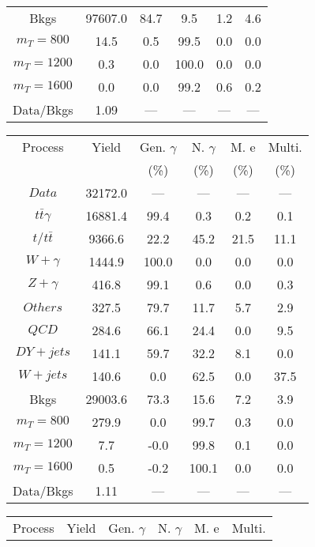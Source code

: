 \begin{figure}
\begin{minipage}[c]{0.32\textwidth}
{\begin{tabular}{cccccc}
Bkgs &  97607.0 &  84.7 &  9.5 &  1.2 &  4.6\\
$ m_{T} = 800 $ &  14.5 &  0.5 &  99.5 &  0.0 &  0.0\\
$ m_{T} = 1200 $ &  0.3 &  0.0 &  100.0 &  0.0 &  0.0\\
$ m_{T} = 1600 $ &  0.0 &  0.0 &  99.2 &  0.6 &  0.2\\
Data/Bkgs &  1.09 &  --- &  --- &  --- &  ---\\
\hline
\end{tabular}
}
\end{minipage}
\begin{minipage}[c]{0.32\textwidth}
\centering
\tiny{
\begin{tabular}{cccccc}
\hline
Process & Yield & Gen. $\gamma$ & N. $\gamma$ & M. e & Multi. \\
 &  & (\%) & (\%) & (\%) & (\%)  \\
\hline
                                                                      $ Data $ &  32172.0 &  --- &  --- &  --- &  ---\\
$ t\bar{t}\gamma $ &  16881.4 &  99.4 &  0.3 &  0.2 &  0.1\\
$ t/t\bar{t} $ &  9366.6 &  22.2 &  45.2 &  21.5 &  11.1\\
$ W+\gamma $ &  1444.9 &  100.0 &  0.0 &  0.0 &  0.0\\
$ Z+\gamma $ &  416.8 &  99.1 &  0.6 &  0.0 &  0.3\\
$ Others $ &  327.5 &  79.7 &  11.7 &  5.7 &  2.9\\
$ QCD $ &  284.6 &  66.1 &  24.4 &  0.0 &  9.5\\
$ DY+jets $ &  141.1 &  59.7 &  32.2 &  8.1 &  0.0\\
$ W+jets $ &  140.6 &  0.0 &  62.5 &  0.0 &  37.5\\
Bkgs &  29003.6 &  73.3 &  15.6 &  7.2 &  3.9\\
$ m_{T} = 800 $ &  279.9 &  0.0 &  99.7 &  0.3 &  0.0\\
$ m_{T} = 1200 $ &  7.7 &  -0.0 &  99.8 &  0.1 &  0.0\\
$ m_{T} = 1600 $ &  0.5 &  -0.2 &  100.1 &  0.0 &  0.0\\
Data/Bkgs &  1.11 &  --- &  --- &  --- &  ---\\
\hline
\end{tabular}
}
\end{minipage}
\begin{minipage}[c]{0.32\textwidth}
\centering
\tiny{
\begin{tabular}{cccccc}
\hline
Process & Yield & Gen. $\gamma$ & N. $\gamma$ & M. e & Multi. \\

\end{tabular}}
\end{minipage}
\end{figure}

